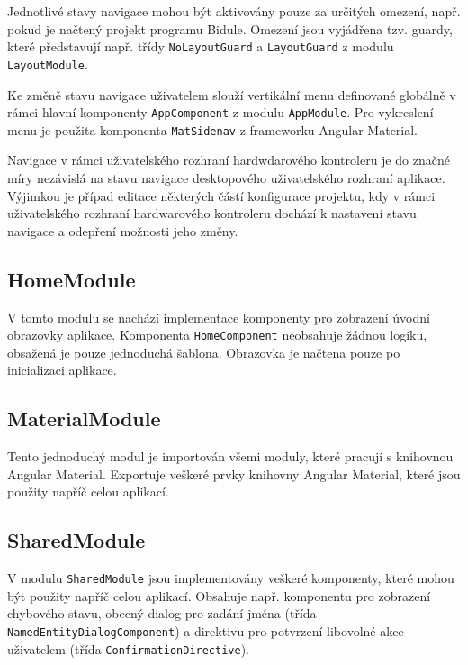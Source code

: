 \documentclass[thesis=M,czech]{FITthesis}[2019/03/06]
\begin{document}
			Jednotlivé stavy navigace mohou být aktivovány pouze za určitých omezení, např. pokud je načtený projekt programu Bidule. 
			Omezení jsou vyjádřena tzv. guardy, které představují např. třídy \texttt{NoLayoutGuard} a \texttt{LayoutGuard} z modulu \texttt{LayoutModule}.
			
			Ke změně stavu navigace uživatelem slouží vertikální menu definované globálně v rámci hlavní komponenty \texttt{AppComponent} z modulu \texttt{AppModule}. Pro vykreslení menu je použita komponenta \texttt{MatSidenav} z frameworku Angular Material.
			
			Navigace v rámci uživatelského rozhraní hardwdarového kontroleru je do značné míry nezávislá na stavu navigace desktopového uživatelského rozhraní aplikace.
			Výjimkou je případ editace některých částí konfigurace projektu, kdy v rámci uživatelského rozhraní hardwarového kontroleru dochází k nastavení stavu navigace a odepření možnosti jeho změny.
			
		\subsection{HomeModule}
			V tomto modulu se nachází implementace komponenty pro zobrazení úvodní obrazovky aplikace. Komponenta \texttt{HomeComponent}
			neobsahuje žádnou logiku, obsažená je pouze jednoduchá šablona. Obrazovka je načtena pouze po inicializaci aplikace.
			
		\subsection{MaterialModule}
			Tento jednoduchý modul je importován všemi moduly, které pracují s knihovnou Angular Material.
			Exportuje veškeré prvky knihovny Angular Material, které jsou použity napříč celou aplikací.
			
		\subsection{SharedModule}
			V modulu \texttt{SharedModule} jsou implementovány veškeré komponenty, které mohou být použity napříč celou aplikací.
			Obsahuje např. komponentu pro zobrazení chybového stavu, obecný dialog pro zadání jména (třída \texttt{Named\-Entity\-Dialog\-Component}) a direktivu pro potvrzení libovolné akce uživatelem (třída \texttt{Confirmation\-Directive}).
			
\end{document}
